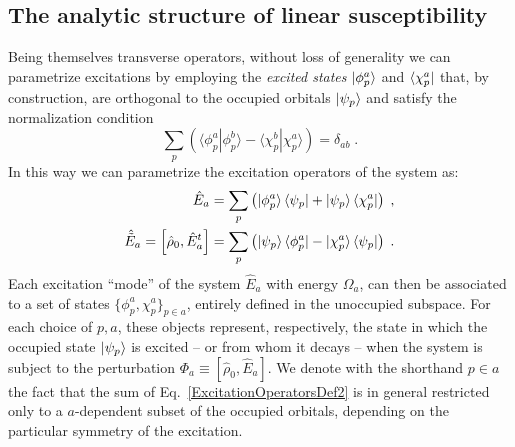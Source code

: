 \documentclass[reprint,aps,prb]{revtex4-1}
\newcommand{\be}{\begin{equation}}
\newcommand{\ee}{\end{equation}}
\newcommand{\nn}{\notag}
\newcommand{\lb}{\label}
\newcommand{\op}[1]{\hat {#1}}
\newcommand{\commutator}[2]{\left[ {#1} , {#2} \right]}
\newcommand{\brket}[2]{\langle  #1 | #2 \rangle} %
\newcommand{\dmnot}{\op{\rho}_0}
\begin{document}
\subsection{The analytic structure of linear susceptibility}
Being themselves transverse operators, without loss of generality we can parametrize excitations by employing  
the \emph{excited states} $\ket{\phi^a_p}$ and $\bra{\chi^a_p}$ that, by construction, are orthogonal to the occupied orbitals
$\ket{\psi_p}$ and satisfy the normalization condition %
\be\lb{ExcitedStateOrthNormDef1}
\sum_p \left(\brket{\phi_p^a}{\phi_p^b} - \brket{\chi_p^b}{\chi_p^a}\right) = \delta_{ab} \;. 
\ee
In this way we can parametrize the excitation operators of the system as:
\begin{align}\lb{ExcitationOperatorsDef2}
\op E_a &= \sum_p \left( \ket{\phi^a_p}\bra{\psi_p} + \ket{\psi_p} \bra{\chi^a_p}\right)\;, \nn \\
\op{\tilde E}_a = \commutator{\dmnot}{\op E^t_a} &= \sum_p \left( \ket{\psi_p}\bra{\phi^a_p} - \ket{\chi^a_p} \bra{\psi_p}\right)\;.
\end{align}
Each excitation ``mode'' of the system $\op E_a$ with energy $\Omega_a$, can then be associated to a set of states $\{\phi^a_p,\chi^a_p\}_{p \in a}$,
entirely defined in the unoccupied subspace. For each choice of $p,a$, these objects represent, respectively, the state in which the occupied state $\ket{\psi_p}$
is excited -- or from whom it decays -- when the system is subject to the perturbation $\Phi_a \equiv \commutator{\dmnot}{\op E_a}$.
We denote with the shorthand $p \in a$ the fact that the sum of Eq.~\eqref{ExcitationOperatorsDef2}
is in general restricted only to a $a$-dependent subset of the occupied orbitals, depending on the particular symmetry 
of the excitation.
\end{document}
